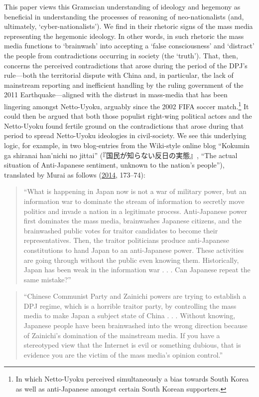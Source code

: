 \documentclass[10pt,british,A4paper,twoside]{memoir}
\begin{document}
This paper views this Gramscian understanding of ideology and hegemony
as beneficial in understanding the processes of reasoning of
neo-nationalists (and, ultimately, `cyber-nationalists'). We find in
their rhetoric signs of the mass media representing the hegemonic
ideology. In other words, in such rhetoric the mass media functions to
`brainwash' into accepting a `false consciousness' and `distract' the people from
contradictions occurring in society (the `truth'). That, then,
concerns the perceived contradictions that arose during the period of
the DPJ's rule---both the territorial dispute with China and, in
particular, the lack of mainstream reporting and inefficient handling by
the ruling government of the 2011 Earthquake---aligned with the distrust
in mass-media that has been lingering amongst Netto-Uyoku, arguably
since the 2002 FIFA soccer match.\footnote{In which Netto-Uyoku
  perceived simultaneously a bias towards South Korea as well as
  anti-Japanese amongst certain South Korean supporters.} It could then
be argued that both those populist right-wing political actors and the
Netto-Uyoku found fertile ground on the contradictions that arose during
that period to spread Netto-Uyoku ideologies in civil-society. We see
this underlying logic, for example, in two blog-entries from the
Wiki-style online blog ``Kokumin ga shiranai han'nichi no jittai''
(『国民が知らない反日の実態』, ``The actual situation of Anti-Japanese
sentiment, unknown to the nation's people''), translated by Murai as
follows (\protect\hyperlink{ref-hollihan_how_2014}{2014}, 173--74):

\begin{quote}
``What is happening in Japan now is not a war of military power, but an
information war to dominate the stream of information to secretly move
politics and invade a nation in a legitimate process. Anti-Japanese
power first dominates the mass media, brainwashes Japanese citizens, and
the brainwashed public votes for traitor candidates to become their
representatives. Then, the traitor politicians produce anti-Japanese
constitutions to hand Japan to an anti-Japanese power. These activities
are going through without the public even knowing them. Historically,
Japan has been weak in the information war . . . Can Japanese repeat the
same mistake?''
\end{quote}

\begin{quote}
``Chinese Communist Party and Zainichi powers are trying to establish a
DPJ regime, which is a horrible traitor party, by controlling the mass
media to make Japan a subject state of China . . . Without knowing,
Japanese people have been brainwashed into the wrong direction because
of Zainichi's domination of the mainstream media. If you have a
stereotyped view that the Internet is evil or something dubious, that is
evidence you are the victim of the mass media's opinion control.''
\end{quote}
\end{document}
